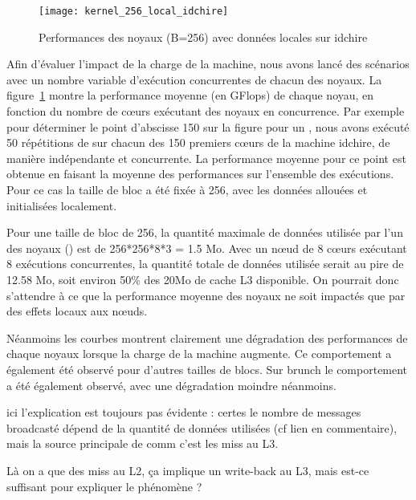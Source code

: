 \begin{figure}[ht]
  \centering
  \texttt{[image: kernel\_256\_local\_idchire]}
  \caption{Performances des noyaux (B=256) avec données locales sur idchire}\label{fig:contribs:apps:cholesky:perf-256-local}
\end{figure}

Afin d'évaluer l'impact de la charge de la machine, nous avons lancé des scénarios avec un nombre variable d'exécution concurrentes de chacun des noyaux. La figure~\ref{fig:contribs:apps:cholesky:perf-256-local} montre la performance moyenne (en GFlops) de chaque noyau, en fonction du nombre de cœurs exécutant des noyaux en concurrence.
Par exemple pour déterminer le point d'abscisse 150 sur la figure pour un \gemm, nous avons exécuté 50 répétitions de \gemm sur chacun des 150 premiers cœurs de la machine idchire, de manière indépendante et concurrente.
La performance moyenne pour ce point est obtenue en faisant la moyenne des performances sur l'ensemble des exécutions.
Pour ce cas la taille de bloc a été fixée à 256, avec les données allouées et initialisées localement.

Pour une taille de bloc de 256, la quantité maximale de données utilisée par l'un des noyaux (\gemm) est de 256*256*8*3 = 1.5 Mo. Avec un nœud de 8 cœurs exécutant 8 exécutions concurrentes, la quantité totale de données utilisée serait au pire de 12.58 Mo, soit environ 50\% des 20Mo de cache L3 disponible.
On pourrait donc s'attendre à ce que la performance moyenne des noyaux ne soit impactés que par des effets locaux aux nœuds.

Néanmoins les courbes montrent clairement une dégradation des performances de chaque noyaux lorsque la charge de la machine augmente.
Ce comportement a également été observé pour d'autres tailles de blocs. Sur brunch le comportement a été également observé, avec une dégradation moindre néanmoins.

\begin{todo}
  ici l'explication est toujours pas évidente : certes le nombre de messages broadcasté dépend de la quantité de données utilisées (cf lien en commentaire), mais la source principale de comm c'est les miss au L3.
  
  Là on a que des miss au L2, ça implique un write-back au L3, mais est-ce suffisant pour expliquer le phénomène ?
\end{todo}

